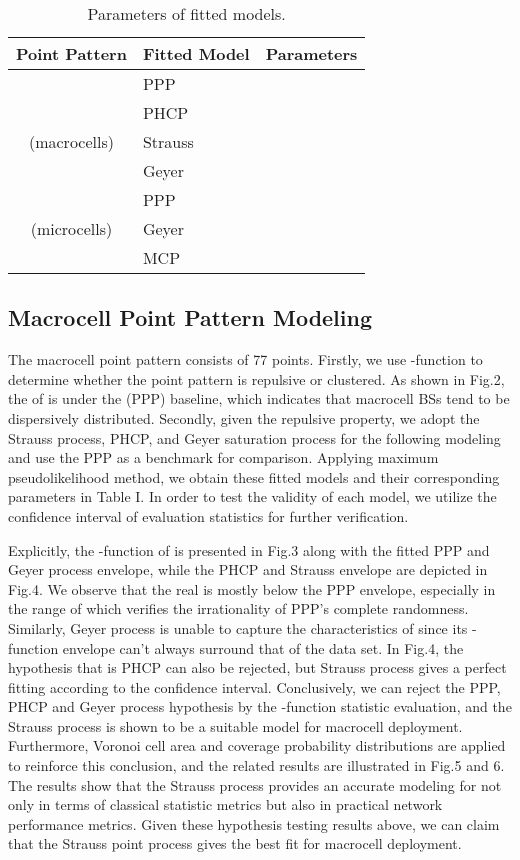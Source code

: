 \documentclass[conference]{IEEEtran}
\begin{document}
\begin{table}[h]
\centering
\caption{Parameters of fitted models.}
\begin{tabular}{cll}
\hline
Point Pattern & Fitted Model & Parameters \\
\hline
                              &   PPP   &             \\
                  &  PHCP   &        \\
        (macrocells)          & Strauss &          \\
                              &  Geyer  &   \\
\hline
                  &   PPP   &              \\
        (microcells)          &  Geyer  &  \\
                              &   MCP   &  \\
\hline
\end{tabular}
\end{table}

\subsection{Macrocell Point Pattern Modeling}

The macrocell point pattern  consists of 77 points. Firstly, we use -function to determine whether the point pattern is repulsive or clustered. As shown in Fig.2, the  of  is under the  (PPP) baseline, which indicates that macrocell BSs tend to be dispersively distributed. Secondly, given the repulsive property, we adopt the Strauss process, PHCP, and Geyer saturation process for the following modeling and use the PPP as a benchmark for comparison. Applying maximum pseudolikelihood method\cite{baddeley2000practical}, we obtain these fitted models and their corresponding parameters in Table I. In order to test the validity of each model, we utilize the confidence interval of evaluation statistics for further verification.

Explicitly, the -function of  is presented in Fig.3 along with the fitted PPP and Geyer process envelope, while the PHCP and Strauss envelope are depicted in Fig.4. We observe that the real  is mostly below the PPP envelope, especially in the range of  which verifies the irrationality of PPP's complete randomness. Similarly, Geyer process is unable to capture the characteristics of  since its -function envelope can't always surround that of the data set. In Fig.4, the hypothesis that  is PHCP can also be rejected, but Strauss process gives a perfect fitting according to the confidence interval. Conclusively, we can reject the PPP, PHCP and Geyer process hypothesis by the -function statistic evaluation, and the Strauss process is shown to be a suitable model for macrocell deployment. Furthermore, Voronoi cell area and coverage probability distributions are applied to reinforce this conclusion, and the related results are illustrated in Fig.5 and 6. The results show that the Strauss process provides an accurate modeling for  not only in terms of classical statistic metrics but also in practical network performance metrics. Given these hypothesis testing results above, we can claim that the Strauss point process gives the best fit for macrocell deployment.
\end{document}
